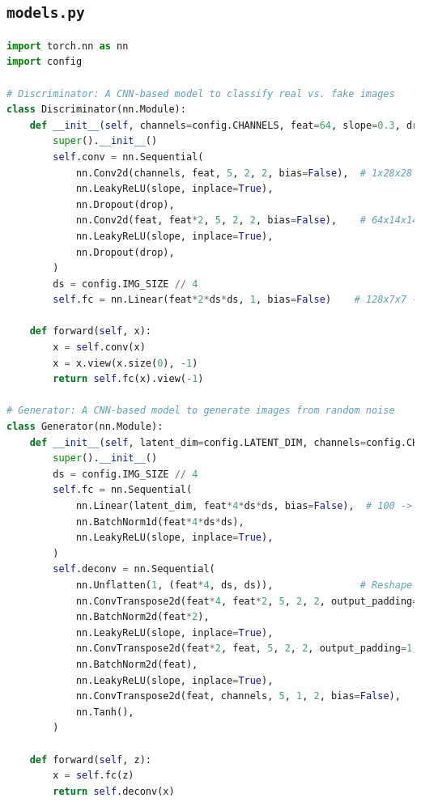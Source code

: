 \documentclass[11pt]{article}
\begin{document}
\subsection{\texttt{models.py}}
\begin{lstlisting}[language=Python, caption={Discriminator and Generator Models}, label={lst:models}, frame=single, basicstyle=\ttfamily\scriptsize, keywordstyle=\color{blue}\bfseries, commentstyle=\color{green!50!black}, stringstyle=\color{red!70!black}]
import torch.nn as nn
import config

# Discriminator: A CNN-based model to classify real vs. fake images
class Discriminator(nn.Module):
    def __init__(self, channels=config.CHANNELS, feat=64, slope=0.3, drop=0.3):
        super().__init__()
        self.conv = nn.Sequential(
            nn.Conv2d(channels, feat, 5, 2, 2, bias=False),  # 1x28x28 -> 64x14x14
            nn.LeakyReLU(slope, inplace=True),
            nn.Dropout(drop),
            nn.Conv2d(feat, feat*2, 5, 2, 2, bias=False),    # 64x14x14 -> 128x7x7
            nn.LeakyReLU(slope, inplace=True),
            nn.Dropout(drop),
        )
        ds = config.IMG_SIZE // 4
        self.fc = nn.Linear(feat*2*ds*ds, 1, bias=False)    # 128x7x7 -> scalar

    def forward(self, x):
        x = self.conv(x)
        x = x.view(x.size(0), -1)
        return self.fc(x).view(-1)

# Generator: A CNN-based model to generate images from random noise
class Generator(nn.Module):
    def __init__(self, latent_dim=config.LATENT_DIM, channels=config.CHANNELS, feat=64, slope=0.3):
        super().__init__()
        ds = config.IMG_SIZE // 4
        self.fc = nn.Sequential(
            nn.Linear(latent_dim, feat*4*ds*ds, bias=False),  # 100 -> 256x7x7
            nn.BatchNorm1d(feat*4*ds*ds),
            nn.LeakyReLU(slope, inplace=True),
        )
        self.deconv = nn.Sequential(
            nn.Unflatten(1, (feat*4, ds, ds)),               # Reshape to 256x7x7
            nn.ConvTranspose2d(feat*4, feat*2, 5, 2, 2, output_padding=1, bias=False),
            nn.BatchNorm2d(feat*2),
            nn.LeakyReLU(slope, inplace=True),
            nn.ConvTranspose2d(feat*2, feat, 5, 2, 2, output_padding=1, bias=False),
            nn.BatchNorm2d(feat),
            nn.LeakyReLU(slope, inplace=True),
            nn.ConvTranspose2d(feat, channels, 5, 1, 2, bias=False),
            nn.Tanh(),
        )

    def forward(self, z):
        x = self.fc(z)
        return self.deconv(x)
\end{lstlisting}
\end{document}
